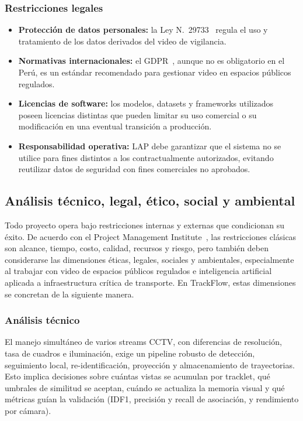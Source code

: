 \documentclass[12pt,a4paper]{article}
\begin{document}
\subsubsection{Restricciones legales}
\begin{itemize}
    \item \textbf{Protección de datos personales:} la Ley
    N.\textdegree~29733~\cite{ley29733} regula el uso y tratamiento de los datos
    derivados del video de vigilancia.
    \item \textbf{Normativas internacionales:} el GDPR~\cite{gdpr}, aunque no es
    obligatorio en el Perú, es un estándar recomendado para gestionar
    video en espacios públicos regulados.
    \item \textbf{Licencias de software:} los modelos, datasets y
    frameworks utilizados poseen licencias distintas que pueden limitar
    su uso comercial o su modificación en una eventual transición a
    producción.
    \item \textbf{Responsabilidad operativa:} LAP debe garantizar que el
    sistema no se utilice para fines distintos a los contractualmente
    autorizados, evitando reutilizar datos de seguridad con fines
    comerciales no aprobados.
\end{itemize}

\subsection{Análisis técnico, legal, ético, social y ambiental}

Todo proyecto opera bajo restricciones internas y externas que
condicionan su éxito. De acuerdo con el Project Management Institute~\cite{pmbok6}, las
restricciones clásicas son alcance, tiempo, costo, calidad, recursos y
riesgo, pero también deben considerarse las dimensiones éticas, legales,
sociales y ambientales, especialmente al trabajar con video de espacios
públicos regulados e inteligencia artificial aplicada a infraestructura
crítica de transporte. En TrackFlow, estas dimensiones se concretan de
la siguiente manera.

\subsubsection{Análisis técnico}

El manejo simultáneo de varios streams CCTV, con diferencias de
resolución, tasa de cuadros e iluminación, exige un pipeline robusto de
detección, seguimiento local, re-identificación, proyección y
almacenamiento de trayectorias. Esto implica decisiones sobre cuántas vistas
se acumulan por tracklet, qué umbrales de similitud se aceptan, cuándo se
actualiza la memoria visual y qué métricas guían la validación (IDF1,
precisión y recall de asociación, y rendimiento por cámara).
\end{document}
